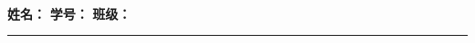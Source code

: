 \begingroup
    \centering
    \LARGE {\bf \Homework} \\[0.5em]
    \large \textbf{姓名：} \Name \hspace{2em}
           \textbf{学号：} \StudentNumber \hspace{2em}
           \textbf{班级：} \Class \par
\endgroup
\rule{\textwidth}{0.4pt}
\printanswers
